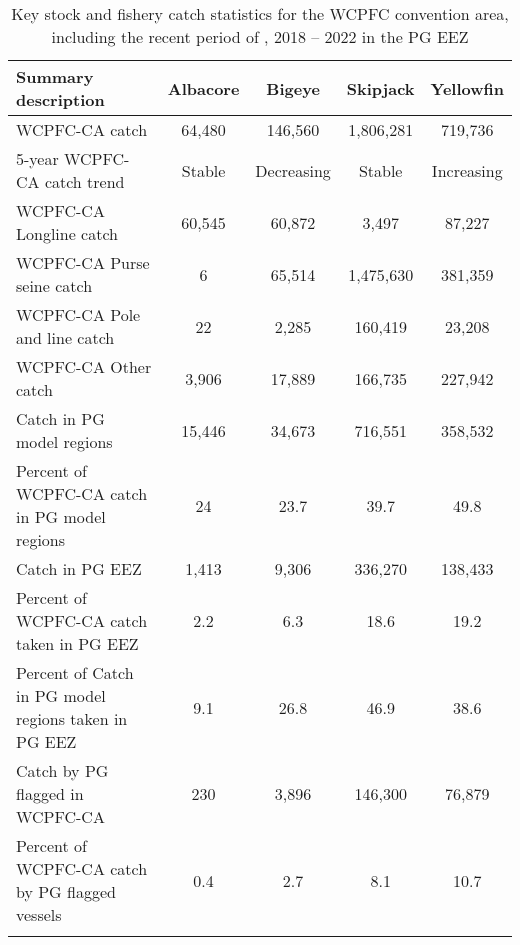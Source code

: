 \begin{longtable}{lcccc}
\caption{Key stock and fishery catch statistics for the WCPFC convention area, including the recent period of , 2018 -- 2022 in the PG EEZ} \\ 
  \hline
Summary description & Albacore & Bigeye & Skipjack & Yellowfin \\ 
  \hline
WCPFC-CA catch & 64,480 & 146,560 & 1,806,281 & 719,736 \\ 
  5-year WCPFC-CA catch trend & Stable & Decreasing & Stable & Increasing \\ 
  WCPFC-CA Longline catch & 60,545 & 60,872 & 3,497 & 87,227 \\ 
  WCPFC-CA Purse seine catch & 6 & 65,514 & 1,475,630 & 381,359 \\ 
  WCPFC-CA Pole and line catch & 22 & 2,285 & 160,419 & 23,208 \\ 
  WCPFC-CA Other catch & 3,906 & 17,889 & 166,735 & 227,942 \\ 
  Catch in PG model regions & 15,446 & 34,673 & 716,551 & 358,532 \\ 
  Percent of WCPFC-CA catch in PG model regions & 24 & 23.7 & 39.7 & 49.8 \\ 
   \hline
Catch in PG EEZ & 1,413 & 9,306 & 336,270 & 138,433 \\ 
  Percent of WCPFC-CA catch taken in PG EEZ & 2.2 & 6.3 & 18.6 & 19.2 \\ 
  Percent of Catch in PG model regions taken in PG EEZ & 9.1 & 26.8 & 46.9 & 38.6 \\ 
  Catch by PG flagged in WCPFC-CA & 230 & 3,896 & 146,300 & 76,879 \\ 
  Percent of WCPFC-CA catch by PG flagged vessels & 0.4 & 2.7 & 8.1 & 10.7 \\ 
  \hline
\label{cat_sum_tab}
\end{longtable}
